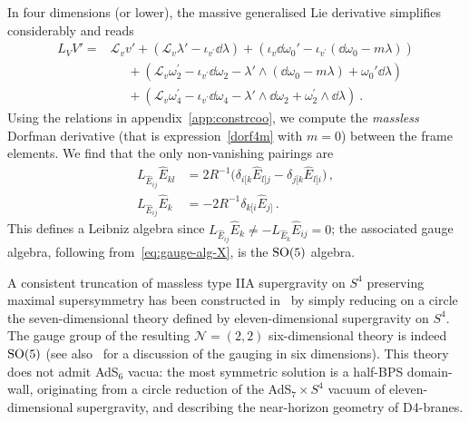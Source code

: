 \documentclass[debug]{phd}
\begin{document}
				In four dimensions (or lower), the massive generalised Lie derivative simplifies considerably and reads
						\begin{equation}\label{dorf4m}
							\begin{split}
								L_V V' =& \mathcal{L}_v v' + \left(\mathcal{L}_v \lambda' - \iota_{v^\prime} \dd\lambda\right) + \left(\iota_v \dd\omega_0' - \iota_{v^\prime} (\dd\omega_0 - m\lambda) \right) \\
										&\phantom{=} + \left(\mathcal{L}_v \omega_2^\prime - \iota_{v^\prime}\dd\omega_2 - \lambda' \wedge (\dd\omega_0 - m\lambda) + \omega_0' \dd\lambda \right) \\
										&\phantom{=} + \left( \mathcal{L}_v \omega_4^\prime - \iota_{v^\prime}\dd\omega_4 - \lambda' \wedge \dd\omega_2 + \omega_2^\prime \wedge \dd\lambda\right) \ .
							\end{split}
						\end{equation}
				Using the relations in appendix~\ref{app:constrcoo}, we compute the \emph{massless} Dorfman derivative (that is expression~\eqref{dorf4m} with $m=0$) between the frame elements. 
				We find that the only non-vanishing pairings are
						\begin{equation}\label{Dorfman_par_S4}
							\begin{split}
								L_{\hat{E}_{ij}}\hat{E}_{kl} &= 2R^{-1}\big(\delta_{i[k}\hat{E}_{l]j} - \delta_{j[k}\hat{E}_{l]i} \big)\, , \\
								L_{\hat{E}_{ij}}\hat{E}_{k} &= -2R^{-1}\delta_{k[i}\hat{E}_{j]} \, .
							\end{split}
						\end{equation}
				This defines a Leibniz algebra since $L_{\hat{E}_{ij}}\hat{E}_{k} \neq -L_{\hat{E}_{k}}\hat{E}_{ij}=0$; the associated gauge algebra, following from~\eqref{eq:gauge-alg-X}, is the $\mathrm{SO}(5)$ algebra.

				A consistent truncation of massless type IIA supergravity on $S^4$ preserving maximal supersymmetry has been constructed in~\cite{Cowdall:1998rs,Cvetic:2000ah} by simply reducing on a circle the seven-dimensional theory defined by eleven-dimensional supergravity on $S^4$. 
				The gauge group of the resulting $\mathcal{N} =(2,2)$ six-dimensional theory is indeed~$\mathrm{SO}(5)$ (see also~\cite{Bergshoeff:2007ef} for a discussion of the gauging in six dimensions). 
				This theory does not admit AdS$_6$ vacua: the most symmetric solution is a half-BPS domain-wall, originating from a circle reduction of the AdS$_7\times S^4$ vacuum of eleven-dimensional supergravity, and describing the near-horizon geometry of D4-branes.
\end{document}

